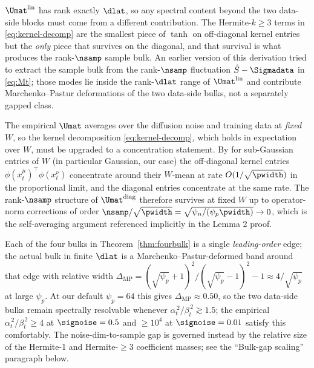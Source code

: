 \begin{remark}
$\Umat^{\mathrm{lin}}$ has rank exactly $\dlat$, so any spectral
content beyond the two data-side blocks must come from a different
contribution. The Hermite-$k\!\ge\!3$ terms in \eqref{eq:kernel-decomp}
are the smallest piece of $\tanh$ on off-diagonal kernel entries but
the \emph{only} piece that survives on the diagonal, and that
survival is what produces the rank-$\nsamp$ sample bulk. An earlier
version of this derivation tried to extract the sample bulk from
the rank-$\nsamp$ fluctuation $\hat S - \Sigmadata$ in
\eqref{eq:Mt}; those modes lie inside the rank-$\dlat$ range of
$\Umat^{\mathrm{lin}}$ and contribute Marchenko--Pastur deformations
of the two data-side bulks, not a separately gapped class.
\end{remark}

\begin{remark}
\label{rem:fixedW}
The empirical $\Umat$ averages over the diffusion noise and training
data at \emph{fixed} $W$, so the kernel decomposition
\eqref{eq:kernel-decomp}, which holds in expectation over $W$, must be
upgraded to a concentration statement. By
\citet{benigni2021eigenvalue} for sub-Gaussian entries of $W$ (in
particular Gaussian, our case) the off-diagonal kernel entries
$\phi(x_t^\mu)^\top\phi(x_t^\nu)$ concentrate around their $W$-mean
at rate $O(1/\sqrt{\pwidth})$ in the proportional limit, and the
diagonal entries concentrate at the same rate. The rank-$\nsamp$
structure of $\Umat^{\mathrm{diag}}$ therefore survives at fixed $W$
up to operator-norm corrections of order $\nsamp/\sqrt{\pwidth}=
\sqrt{\psi_n/(\psi_p \pwidth)}\to 0$, which is the self-averaging
argument referenced implicitly in the Lemma 2 proof.
\end{remark}

\begin{remark}
\label{rem:MP}
Each of the four bulks in Theorem~\ref{thm:fourbulk} is a single
\emph{leading-order} edge; the actual bulk in finite $\dlat$ is a
Marchenko--Pastur-deformed band around that edge with relative width
$\Delta_{\mathrm{MP}} = (\sqrt{\psi_p}+1)^2/(\sqrt{\psi_p}-1)^2 - 1
\approx 4/\sqrt{\psi_p}$ at large $\psi_p$. At our default
$\psi_p = 64$ this gives $\Delta_{\mathrm{MP}}\approx 0.50$, so the
two data-side bulks remain spectrally resolvable whenever
$\alpha_t^{\,2}/\beta_t^{\,2}\gtrsim 1.5$; the empirical
$\alpha_t^{\,2}/\beta_t^{\,2}\ge 4$ at $\signoise=0.5$ and
$\ge 10^4$ at $\signoise=0.01$ satisfy this comfortably. The
noise-dim-to-sample gap is governed instead by the relative size of
the Hermite-1 and Hermite-$\ge 3$ coefficient masses; see the
``Bulk-gap scaling'' paragraph below.
\end{remark}

